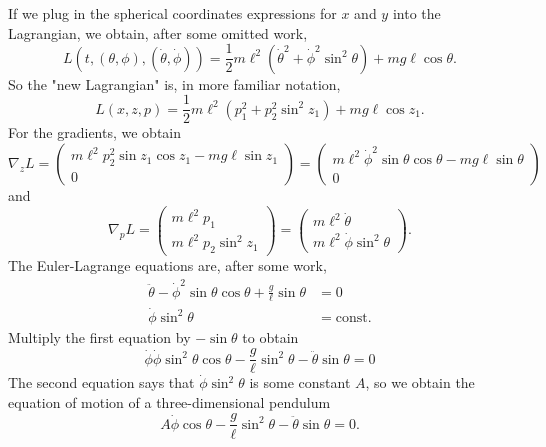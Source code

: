 \documentclass[11pt]{article}
\begin{document}
\begin{enumerate}
If we plug in the spherical coordinates expressions for $x$ and $y$ into the Lagrangian, we obtain, after some omitted work,
\[
L \left(t, (\theta, \phi), (\dot{\theta}, \dot{\phi}) \right) = \frac{1}{2} m \ell^2 \left( \dot{\theta}^2 + \dot{\phi}^2 \sin^2 \theta \right) + m g \ell \cos \theta.
\]
So the "new Lagrangian" is, in more familiar notation,
\[
L(x,z,p) = \frac{1}{2} m \ell^2 \left( p_1^2 + p_2^2 \sin^2 z_1 \right) + mg \ell \cos z_1.
\]
For the gradients, we obtain
\[
\nabla_z L = \begin{pmatrix}
m \ell^2 p_2^2 \sin z_1 \cos z_1 - mg \ell \sin z_1 \\ 0
\end{pmatrix} = \begin{pmatrix}
m \ell^2 \dot{\phi}^2 \sin \theta \cos \theta - mg \ell \sin \theta \\ 0
\end{pmatrix}
\]
and
\[
\nabla_p L = \begin{pmatrix}
m \ell^2 p_1 \\
m \ell^2 p_2 \sin^2 z_1
\end{pmatrix} = \begin{pmatrix}
m \ell^2 \dot{\theta} \\
m \ell^2 \dot{\phi} \sin^2 \theta
\end{pmatrix}.
\]
The Euler-Lagrange equations are, after some work,
\begin{align*}
\ddot{\theta} - \dot{\phi}^2 \sin \theta \cos \theta + \frac{g}{\ell} \sin \theta &= 0 \\
\dot{\phi} \sin^2 \theta &= \mathrm{const}.
\end{align*}
Multiply the first equation by $-\sin \theta$ to obtain
\[
\dot{\phi} \dot{\phi} \sin^2 \theta \cos \theta - \frac{g}{\ell} \sin^2  \theta - \ddot{\theta} \sin{\theta} = 0
\]
The second equation says that $\dot{\phi} \sin^2 \theta$ is some constant $A$, so we obtain the equation of motion of a three-dimensional pendulum
\[
\boxed{A \dot{\phi} \cos \theta - \frac{g}{\ell} \sin^2 \theta - \ddot{\theta} \sin \theta = 0.}
\]


\end{enumerate}
\end{document}
